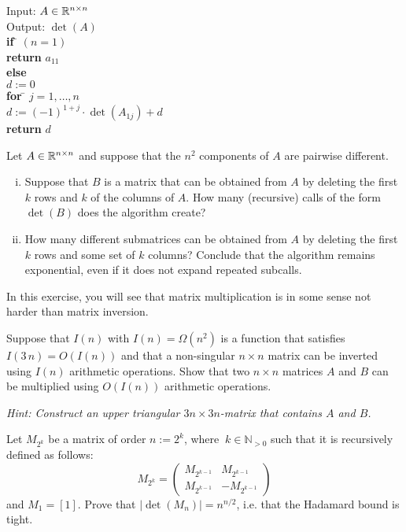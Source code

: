 \documentclass[11pt]{article}
\begin{document}
\begin{tabbing}
  Input: $A \in \mathbb{R}^{n \times n}$ \\
  Output: $\det(A)$ \\
  
  {\bf if} \= $(n=1)$ \\
           \> {\bf return} $a_{11}$ \\
  {\bf else} \\
           \> $d:=0$  \\
           \> {\bf for } \= $j=1,\dots,n$ \\
           \>            \> $d:= (-1)^{1+j}⋅ \det(A_{1j}) +d$\\
           \> {\bf return} $d$   
\end{tabbing}

Let $A \in \mathbb{R}^{n \times n}$  and suppose that the $n^2$ components of $A$ are pairwise different.
\begin{enumerate}[i)]
\item
Suppose that $B$ is a matrix that can be obtained from $A$ by deleting the first $k$ rows and $k$ of the columns of $A$. How many (recursive) calls of the form $\det(B)$ does the algorithm create? 

\item How many different submatrices can be obtained from $A$ by deleting the first $k$ rows and some set of $k$ columns? Conclude that the algorithm remains exponential, even if it does not expand repeated subcalls. 
\end{enumerate}
  
\problem In this exercise, you will see that matrix multiplication is in some sense not harder than matrix inversion. 

Suppose that $I(n)$ with $I(n)=\Omega(n^2)$ is a function that satisfies $I(3\,n) = O(I(n))$ and that a non-singular  $n \times n$ matrix can be inverted using $I(n)$ arithmetic operations. Show that two $n \times n $ matrices $A$ and $B$ can be multiplied using $O(I(n))$ arithmetic operations. 

\emph{Hint: Construct an upper triangular $3n \times 3n$-matrix that contains $A$ and $B$. }

\problemstar Let $M_{2^k}$ be a matrix of order $n:=2^k$, where $\ k \in \mathbb{N}_{>0}$ such that it is recursively defined as follows:
\begin{equation}
M_{2^k}=
\begin{pmatrix}
    M_{2^{k-1}} & M_{2^{k-1}} \\ 
    M_{2^{k-1}} & -M_{2^{k-1}} 
  \end{pmatrix}
\end{equation}
and $M_1=[1]$. Prove that $|\det(M_{n})|=n^{n/2}$, i.e. that the Hadamard bound is tight.
\end{document}
